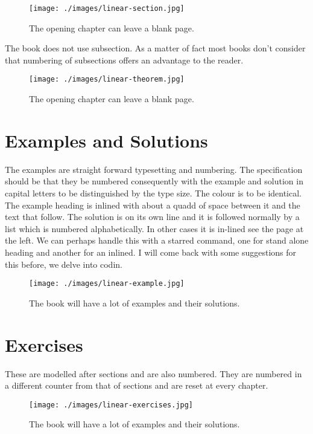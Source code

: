 \begin{figure}[htbp]
\texttt{[image: ./images/linear-section.jpg]}
\caption{The opening chapter can leave a blank page. }
\end{figure}

The book does not use subsection. As a matter of fact most books don’t consider that numbering of subsections offers an advantage to the reader. 

\begin{figure}[htbp]
\texttt{[image: ./images/linear-theorem.jpg]}
\caption{The opening chapter can leave a blank page. }
\end{figure}


\section{Examples and Solutions}

The examples are straight forward typesetting and numbering. The specification should be that they be numbered consequently with the example and solution in capital letters to be distinguished by the type size. The colour is to be identical. The example heading is inlined with about a quadd of space between it and the text that follow. The solution is on its own line and it is followed normally by a list which is numbered alphabetically. In other cases it is in-lined see the page at the left. We can perhaps handle this with a starred command, one for stand alone heading and another for an inlined. I will come back with some suggestions for this before, we delve into codin.

\begin{figure}[htbp]
\texttt{[image: ./images/linear-example.jpg]}
\caption{The book will have a lot of examples and their solutions. }
\end{figure}

\section{Exercises}

These are modelled after sections and are also numbered. They are numbered in a different counter from that of sections and are reset at every chapter. 

\begin{figure}[htbp]
\texttt{[image: ./images/linear-exercises.jpg]}
\caption{The book will have a lot of examples and their solutions. }
\end{figure}

